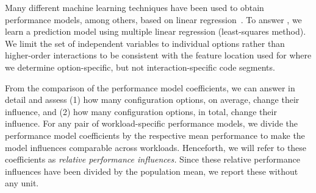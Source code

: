 Many different machine learning techniques have been used to obtain performance models, among others, based on linear regression~\cite{perLasso,siegmundPerformanceinfluenceModelsHighly2015,dorn2020}. To answer , we learn a prediction model using multiple linear regression (least-squares method). We limit the set of independent variables to individual options rather than higher-order interactions to be consistent with the feature location used for  where we determine option-specific, but not interaction-specific code segments.

From the comparison of the performance model coefficients, we can answer  in detail and assess (1) how many configuration options, on average, change their influence, and (2) how many configuration options, in total, change their influence. For any pair of workload-specific performance models, we divide the performance model coefficients by the respective mean performance to make the model influences comparable across workloads. Henceforth, we will refer to these coefficients as \textit{relative performance influences.} Since these relative performance influences have been divided by the population mean, we report these without any unit.

